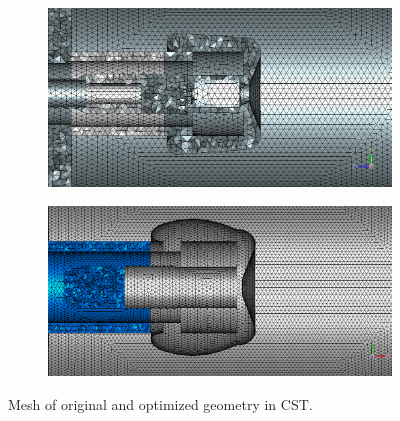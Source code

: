 \begin{center}
\begin{figure}[H]
   \begin{subfigure}{0.45\textwidth}
      \includegraphics[width=\textwidth]{figures/200kV/cst/efield_orig_mesh}
   \end{subfigure}
   \begin{subfigure}{0.45\textwidth}
      \includegraphics[width=\textwidth]{figures/200kV/cst/efield_mesh}
   \end{subfigure}
   \caption{Mesh of original and optimized geometry in CST.}
\end{figure}
\end{center}

